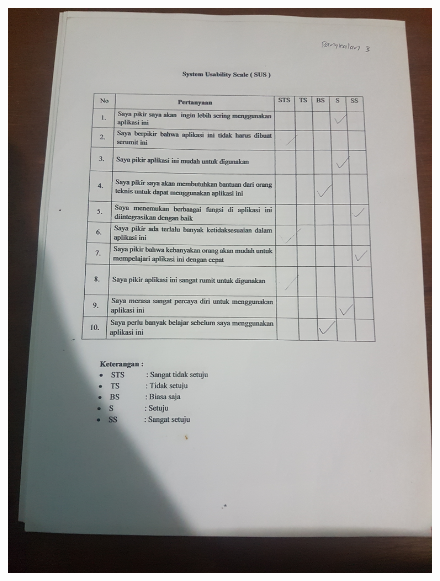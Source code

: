 \begin{figure}[H]
	\center
	\includegraphics [width = 17cm,angle=-90]{gambar/pengujian/pangkalan3}
\end{figure}
